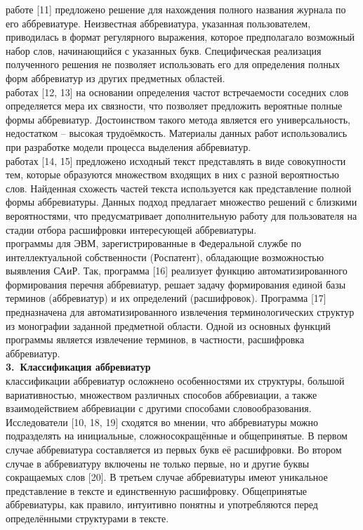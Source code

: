 \documentclass[a4paper, 12pt]{article}
\begin{document}
 работе [11] предложено решение для нахождения полного названия журнала по его аббревиатуре. Неизвестная аббревиатура, указанная пользователем, приводилась в формат регулярного выражения, которое предполагало возможный набор слов, начинающийся с указанных букв. Специфическая реализация полученного решения не позволяет использовать его для определения полных форм аббревиатур из других предметных областей.\\
 работах [12, 13] на основании определения частот встречаемости соседних слов определяется мера их связности, что позволяет предложить вероятные полные формы аббревиатур. Достоинством такого метода является его универсальность, недостатком – высокая трудоёмкость. Материалы данных работ использовались при разработке модели процесса выделения аббревиатур.\\
 работах [14, 15] предложено исходный текст представлять в виде совокупности тем, которые образуются множеством входящих в них с разной вероятностью слов. Найденная схожесть частей текста используется как представление полной формы аббревиатуры. Данных подход предлагает множество решений с близкими вероятностями, что предусматривает дополнительную работу для пользователя на стадии отбора расшифровки интересующей аббревиатуры.\\
 программы для ЭВМ, зарегистрированные в Федеральной службе по интеллектуальной собственности (Роспатент), обладающие возможностью выявления САиР. Так, программа [16] реализует функцию автоматизированного формирования перечня аббревиатур, решает задачу формирования единой базы терминов (аббревиатур) и их определений (расшифровок). Программа [17] предназначена для автоматизированного извлечения терминологических структур из монографии заданной предметной области. Одной из основных функций программы является извлечение терминов, в частности, расшифровка аббревиатур.\\
\indent\textbf{3. Классификация аббревиатур}\\
 классификации аббревиатур осложнено особенностями их структуры, большой вариативностью, множеством различных способов аббревиации, а также взаимодействием аббревиации с другими способами словообразования. Исследователи [10, 18, 19] сходятся во мнении, что аббревиатуры можно подразделять на инициальные, сложносокращённые и общепринятые. В первом случае аббревиатура составляется из первых букв её расшифровки. Во втором случае в аббревиатуру включены не только первые, но и другие буквы сокращаемых слов [20]. В третьем случае аббревиатуры имеют уникальное представление в тексте и единственную расшифровку. Общепринятые аббревиатуры, как правило, интуитивно понятны и употребляются перед определёнными структурами в тексте.\\
\end{document}
